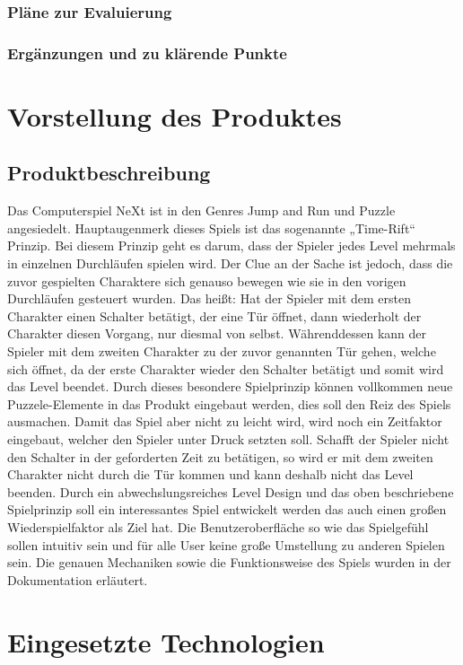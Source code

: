 \subsection{Pläne zur Evaluierung}
\subsection{Ergänzungen und zu klärende Punkte}
\chapter{Vorstellung des Produktes}
\section{Produktbeschreibung}
Das Computerspiel NeXt ist in den Genres Jump and Run und Puzzle angesiedelt. Hauptaugenmerk dieses Spiels ist das sogenannte „Time-Rift“ Prinzip. Bei diesem Prinzip geht es darum, dass der Spieler jedes Level mehrmals in einzelnen Durchläufen spielen wird. Der Clue an der Sache ist jedoch, dass die zuvor gespielten Charaktere sich genauso bewegen wie sie in den vorigen Durchläufen gesteuert wurden. Das heißt: Hat der Spieler mit dem ersten Charakter einen Schalter betätigt, der eine Tür öffnet, dann wiederholt der Charakter diesen Vorgang, nur diesmal von selbst. Währenddessen kann der Spieler mit dem zweiten Charakter zu der zuvor genannten Tür gehen, welche sich öffnet, da der erste Charakter wieder den Schalter betätigt und somit wird das Level beendet. Durch dieses besondere Spielprinzip können vollkommen neue Puzzele-Elemente in das Produkt eingebaut werden, dies soll den Reiz des Spiels ausmachen.  Damit das Spiel aber nicht zu leicht wird, wird noch ein Zeitfaktor eingebaut, welcher den Spieler unter Druck setzten soll. Schafft der Spieler nicht den Schalter in der geforderten Zeit zu betätigen, so wird er mit dem zweiten Charakter nicht durch die Tür kommen und kann deshalb nicht das Level beenden. Durch ein abwechslungsreiches Level Design und das oben beschriebene Spielprinzip soll ein interessantes Spiel entwickelt werden das auch einen großen Wiederspielfaktor als Ziel hat. Die Benutzeroberfläche so wie das Spielgefühl sollen intuitiv sein und für alle User keine große Umstellung zu anderen Spielen sein. Die genauen Mechaniken sowie die Funktionsweise des Spiels wurden in der Dokumentation erläutert.  
\chapter{Eingesetzte Technologien}
